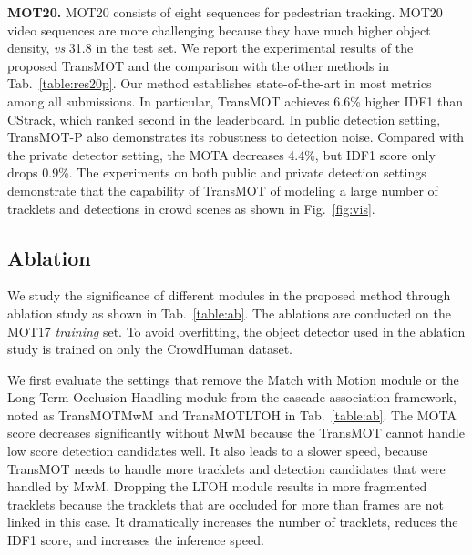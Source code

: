 \documentclass[10pt,twocolumn,letterpaper]{article}
\begin{document}
\noindent\textbf{MOT20.}
MOT20 consists of eight sequences for pedestrian tracking. 
MOT20 video sequences are more challenging because they have much higher object density,  \textit{vs} 31.8 in the test set. 
We report the experimental results of the proposed TransMOT and the comparison with the other methods in Tab.~\ref{table:res20p}. 
Our method establishes state-of-the-art in most metrics among all submissions.
In particular, TransMOT achieves 6.6\% higher IDF1 than CStrack, which ranked second in the leaderboard. 
In public detection setting, TransMOT-P also demonstrates its robustness to detection noise.
Compared with the private detector setting, the MOTA decreases 4.4\%, but IDF1 score only drops 0.9\%. 
The experiments on both public and private detection settings demonstrate that the capability of TransMOT of modeling a large number of tracklets and detections in crowd scenes as shown in Fig.~\ref{fig:vis}. 





\subsection{Ablation}

We study the significance of different modules in the proposed method through ablation study as shown in Tab.~\ref{table:ab}. 
The ablations are conducted on the MOT17 \emph{training} set.
To avoid overfitting, the object detector used in the ablation study is trained on only the CrowdHuman dataset.

We first evaluate the settings that remove the Match with Motion module or the Long-Term Occlusion Handling module from the cascade association framework, noted as TransMOTMwM and TransMOTLTOH in Tab.~\ref{table:ab}. 
The MOTA score decreases significantly without MwM because the TransMOT cannot handle low score detection candidates well. 
It also leads to a slower speed, because TransMOT needs to handle more tracklets and detection candidates that were handled by MwM.
Dropping the LTOH module results in more fragmented tracklets because the tracklets that are occluded for more than  frames are not linked in this case.
It dramatically increases the number of tracklets, reduces the IDF1 score, and increases the inference speed.
\end{document}
